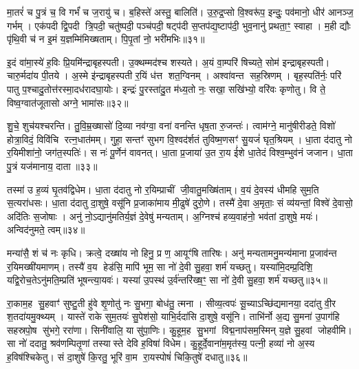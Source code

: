 मा॒तरं॑ च पु॒त्रं च॒ वि गर्भं॑ च ज॒रायु॑ च। ब॒हिस्ते॑ अस्तु॒ बालिति॑। उ॒रु॒द्र॒प्सो वि॒श्वरू॑प॒ इन्दुः॒ पव॑मानो॒ धीर॑ आनञ्ज॒ गर्भम्। एक॑पदी द्वि॒पदी त्रि॒पदी॒ चतु॑ष्पदी॒ पञ्च॑पदी॒ षट्प॑दी स॒प्तप॑द्य॒ष्टाप॑दी॒ भुव॒नानु॑ प्रथता॒ꣳ॒ स्वाहा। म॒ही द्यौः पृ॑थि॒वी च॑ न इ॒मं य॒ज्ञम्मि॑मिख्षताम्। पि॒पृ॒तां नो॒ भरी॑मभिः॥३१॥

{\anuvakamend[{ग॒वी॒न्यौ॑ वि चतु॑श्चत्वारिशच्च॥10॥}]}

इ॒दं वा॑मा॒स्ये॑ ह॒विः प्रि॒यमि॑न्द्राबृहस्पती। उ॒क्थम्मद॑श्च शस्यते। अ॒यं वा॒म्परि॑ षिच्यते॒ सोम॑ इन्द्राबृहस्पती। चारु॒र्मदा॑य पी॒तये। अ॒स्मे इ॑न्द्राबृहस्पती र॒यिं ध॑त्त शत॒ग्विनम्। अश्वा॑वन्त सह॒स्रिणम्। बृह॒स्पति॑र्नः॒ परि॑ पातु प॒श्चादु॒तोत्त॑रस्मा॒दध॑रादघा॒योः। इन्द्रः॑ पु॒रस्ता॑दु॒त म॑ध्य॒तो नः॒ सखा॒ सखि॑भ्यो॒ वरि॑वः कृणोतु। वि ते॒ विष्व॒ग्वात॑जूतासो अग्ने॒ भामा॑सः॥३२॥

शु॒चे॒ शुच॑यश्चरन्ति। तु॒वि॒म्र॒ख्षासो॑ दि॒व्या नव॑ग्वा॒ वना॑ वनन्ति धृष॒ता रु॒जन्तः॑। त्वाम॑ग्ने॒ मानु॑षीरीडते॒ विशो॑ होत्रा॒विदं॒ विवि॑चि रत्न॒धात॑मम्। गुहा॒ सन्तꣳ॑ सुभग वि॒श्वद॑र्शतं तुविष्म॒णसꣳ॑ सु॒यजं॑ घृत॒श्रियम्। धा॒ता द॑दातु नो र॒यिमीशा॑नो॒ जग॑त॒स्पतिः॑। स नः॑ पू॒र्णेन॑ वावनत्। धा॒ता प्र॒जाया॑ उ॒त रा॒य ई॑शे धा॒तेदं विश्व॒म्भुव॑नं जजान। धा॒ता पु॒त्रं यज॑मानाय॒ दाता॥३३॥

तस्मा॑ उ ह॒व्यं घृ॒तव॑द्विधेम। धा॒ता द॑दातु नो र॒यिम्प्राचीं जी॒वातु॒मख्षि॑ताम्। व॒यं दे॒वस्य॑ धीमहि सुम॒ति स॒त्यरा॑धसः। धा॒ता द॑दातु दा॒शुषे॒ वसू॑नि प्र॒जाका॑माय मी॒ढुषे॑ दुरो॒णे। तस्मै॑ दे॒वा अ॒मृताः॒ सं व्य॑यन्तां॒ विश्वे॑ दे॒वासो॒ अदि॑तिः स॒जोषाः। अनु॑ नो॒ऽद्यानु॑मतिर्य॒ज्ञं दे॒वेषु॑ मन्यताम्। अ॒ग्निश्च॑ हव्य॒वाह॑नो॒ भव॑तां दा॒शुषे॒ मयः॑। अन्विद॑नुमते॒ त्वम्॥३४॥

मन्या॑सै॒ शं च॑ नः कृधि। क्रत्वे॒ दख्षा॑य नो हिनु॒ प्र ण॒ आयूꣳ॑षि तारिषः। अनु॑ मन्यतामनु॒मन्य॑माना प्र॒जाव॑न्त र॒यिमख्षी॑यमाणम्। तस्यै॑ व॒य हेड॑सि॒ मापि॑ भूम॒ सा नो॑ दे॒वी सु॒हवा॒ शर्म॑ यच्छतु। यस्या॑मि॒दम्प्र॒दिशि॒ यद्वि॒रोच॒तेऽनु॑मति॒म्प्रति॑ भूषन्त्या॒यवः॑। यस्या॑ उ॒पस्थ॑ उ॒र्व॑न्तरि॑ख्ष॒ꣳ॒ सा नो॑ दे॒वी सु॒हवा॒ शर्म॑ यच्छतु॥३५॥

रा॒काम॒ह सु॒हवाꣳ॑ सुष्टु॒ती हु॑वे शृ॒णोतु॑ नः सु॒भगा॒ बोध॑तु॒ त्मना। सीव्य॒त्वपः॑ सू॒च्याऽच्छि॑द्यमानया॒ ददा॑तु वी॒र श॒तदा॑यमु॒क्थ्यम्। यास्ते॑ राके सुम॒तयः॑ सु॒पेश॑सो॒ याभि॒र्ददा॑सि दा॒शुषे॒ वसू॑नि। ताभि॑र्नो अ॒द्य सु॒मना॑ उ॒पाग॑हि सहस्रपो॒ष सु॑भगे॒ ररा॑णा। सिनी॑वालि॒ या सु॑पा॒णिः। कु॒हूम॒ह सु॒भगां विद्म॒नाप॑सम॒स्मिन् य॒ज्ञे सु॒हवां जोहवीमि। सा नो॑ ददातु॒ श्रव॑णम्पितृ॒णां तस्यास्ते देवि ह॒विषा॑ विधेम। कु॒हूर्दे॒वाना॑म॒मृत॑स्य॒ पत्नी॒ हव्या॑ नो अ॒स्य ह॒विष॑श्चिकेतु। सं दा॒शुषे॑ कि॒रतु॒ भूरि॑ वा॒म रा॒यस्पोषं॑ चिकि॒तुषे॑ दधातु॥३६॥

